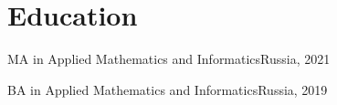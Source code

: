 \section{Education}
\begin{educationEntry}{MA in Applied Mathematics and Informatics}{Russia, 2021}
\end{educationEntry}
\begin{educationEntry}{BA in Applied Mathematics and Informatics}{Russia, 2019}
\end{educationEntry}
